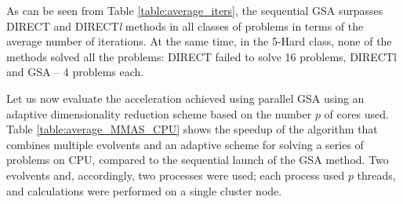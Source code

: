 \documentclass{svproc}
\begin{document}
As can be seen from Table \ref{table:average_iters}, the sequential GSA surpasses DIRECT and DIRECT\textit{l} methods in all classes of problems in terms of the average number of iterations. At the same time, in the 5-Hard class, none of the methods solved all the problems: DIRECT failed to solve 16 problems, DIRECTl and GSA -- 4 problems each.




Let us now evaluate the acceleration achieved using parallel GSA using an adaptive dimensionality reduction scheme based on the number $p$ of cores used.
Table \ref{table:average_MMAS_CPU} shows the speedup of the algorithm that combines multiple evolvents and an adaptive scheme for solving a series of problems on CPU, compared to the sequential launch of the GSA method. Two evolvents and, accordingly, two processes were used; each process used $p$ threads, and calculations were performed on a single cluster node.
   
\end{document}
